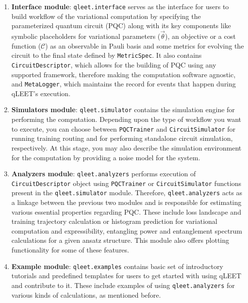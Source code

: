 \begin{enumerate}

	\item \textbf{Interface module}: \texttt{qleet.interface} serves as the interface for users to build workflow of the variational computation by specifying the parameterized quantum circuit (PQC) along with its key components like symbolic placeholders for variational parameters ($\vec{\theta}$), an objective or a cost function ($\mathcal{C}$) as an observable in Pauli basis and some metrics for evolving the circuit to the final state defined by \texttt{MetricSpec}. It also contains \texttt{CircuitDescriptor}, which allows for the building of PQC using any supported framework, therefore making the computation software agnostic, and \texttt{MetaLogger}, which maintains the record for events that happen during qLEET's execution. 

	\item \textbf{Simulators module}: \texttt{qleet.simulator} contains the  simulation engine for performing the computation. Depending upon the type of workflow you want to execute, you can choose between \texttt{PQCTrainer} and \texttt{CircuitSimulator} for running training routing and for performing standalone circuit simulation, respectively. At this stage, you may also describe the simulation environment for the computation by providing a noise model for the system. 

	\item \textbf{Analyzers module}: \texttt{qleet.analyzers} performs execution of \texttt{CircuitDescriptor} object using \texttt{PQCTrainer} or \texttt{CircuitSimulator} functions present in the \texttt{qleet.simulator} module. Therefore, \texttt{qleet.analyzers} acts as a linkage between the previous two modules and is responsible for estimating various essential properties regarding PQC. These include loss landscape and training trajectory calculation or histogram prediction for variational computation and expressibility, entangling power and entanglement spectrum calculations for a given ansatz structure. This module also offers plotting functionality for some of these features.
	
	\item \textbf{Example module}: \texttt{qleet.examples} contains basic set of introductory tutorials and predefined templates for users to get started with using qLEET and contribute to it. These include examples of using \texttt{qleet.analyzers} for various kinds of calculations, as mentioned before.

\end{enumerate} 

